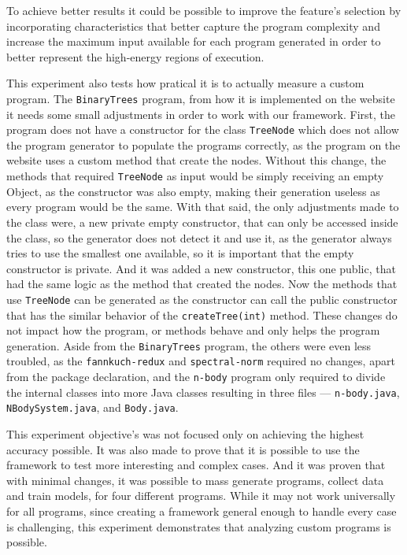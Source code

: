 To achieve better results it could be possible to improve the feature's selection by incorporating characteristics that better capture the program complexity and increase the maximum input available for each program generated in order to better represent the high-energy regions of execution.


This experiment also tests how pratical it is to actually measure a custom program. 
The \texttt{BinaryTrees} program, from how it is implemented on the website it needs some small adjustments in order to work with our framework. First, the program does not have a constructor for the class \texttt{TreeNode} which does not allow the program generator to populate the programs correctly, as the program on the website uses a custom method that create the nodes. Without this change, the methods that required \texttt{TreeNode} as input would be simply receiving an empty Object, as the constructor was also empty, making their generation useless as every program would be the same.
With that said, the only adjustments made to the class were, a new private empty constructor, that can only be accessed inside the class, so the generator does not detect it and use it, as the generator always tries to use the smallest one available, so it is important that the empty constructor is private. And it was added a new constructor, this one public, that had the same logic as the method that created the nodes. Now the methods that use \texttt{TreeNode} can be generated as the constructor can call the public constructor that has the similar behavior of the \texttt{createTree(int)} method. These changes do not impact how the program, or methods behave and only helps the program generation.
Aside from the \texttt{BinaryTrees} program, the others were even less troubled, as the \texttt{fannkuch-redux} and \texttt{spectral-norm} required no changes, apart from the package declaration, and the \texttt{n-body} program only required to divide the internal classes into more Java classes resulting in three files — \texttt{n-body.java}, \texttt{NBodySystem.java}, and \texttt{Body.java}.


This experiment objective's was not focused only on achieving the highest accuracy possible. It was also made to prove that it is possible to use the framework to test more interesting and complex cases. And it was proven that with minimal changes, it was possible to mass generate programs, collect data and train models, for four different programs. While it may not work universally for all programs, since creating a framework general enough to handle every case is challenging, this experiment demonstrates that analyzing custom programs is possible.


